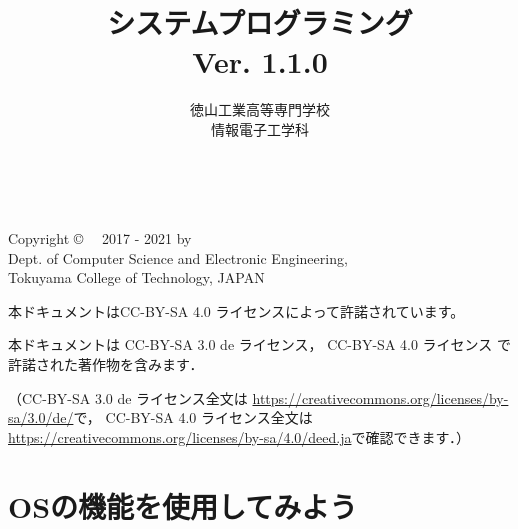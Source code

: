 \documentclass[a4paper,11pt,twocolumn]{ltjsbook}      %
\begin{document}
\frontmatter
\title{システムプログラミング\\Ver. 1.1.0}
\author{徳山工業高等専門学校\\情報電子工学科}
\date{}
\maketitle

\thispagestyle{empty}
\onecolumn
~
\vfill
\begin{flushleft}
Copyright \copyright ~~ 2017 - 2021 by \\
Dept. of Computer Science and Electronic Engineering, \\
Tokuyama College of Technology, JAPAN
\end{flushleft}

\vspace{0.8cm}
本ドキュメントはCC-BY-SA 4.0 ライセンスによって許諾されています。

本ドキュメントは
CC-BY-SA 3.0 de ライセンス，
CC-BY-SA 4.0 ライセンス
で許諾された著作物を含みます．

（CC-BY-SA 3.0 de ライセンス全文は
\url{https://creativecommons.org/licenses/by-sa/3.0/de/}で，
CC-BY-SA 4.0 ライセンス全文は
\url{https://creativecommons.org/licenses/by-sa/4.0/deed.ja}で確認できます．）

\setcounter{tocdepth}{2}
\tableofcontents

\mainmatter

\part{OSの機能を使用してみよう}
\setcounter{page}{23}               %
\end{document}
